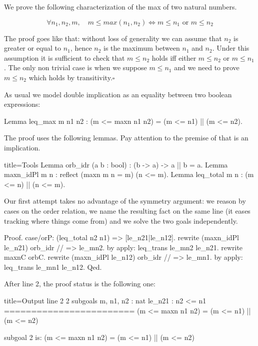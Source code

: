We prove the following characterization of the max of two natural numbers.

$$
\forall n_1, n_2, m, \quad m \le max(n_1,n_2)
\Leftrightarrow m \le n_1 \textrm{ or } m \le n_2
$$

The proof goes like that: without loss of generality we can assume that
$n_2$ is greater or equal to $n_1$, hence $n_2$ is the maximum between
$n_1$ and $n_2$.  Under this assumption it is sufficient to check
that $m \le n_2$ holds iff either $m \le n_2$ or $m \le n_1$.
The only non trivial case is when we suppose $m \le n_1$ and
we need to prove $m \le n_2$ which holds by transitivity.\hfill$\square$

As usual we model double implication as an equality between two
boolean expressions:

\begin{coq}{}{}
Lemma leq_max m n1 n2 : (m <= maxn n1 n2) = (m <= n1) || (m <= n2).
\end{coq}

The proof uses the following lemmas.  Pay attention to the premise of
 that is an implication.

\begin{coq}{}{title=Tools}
Lemma orb_idr (a b : bool) : (b -> a) -> a || b = a.
Lemma maxn_idPl {m n} : reflect (maxn m n = m) (n <= m).
Lemma leq_total m n : (m <= n) || (n <= m).
\end{coq}

Our first attempt takes no advantage of the symmetry argument:
we reason by cases on the order relation,
we name the resulting fact on the same line
(it eases tracking where things come from) and we solve the two
goals independently.

\begin{coq}{}{}
Proof.
case/orP: (leq_total n2 n1) => [le_n21|le_n12].
  rewrite (maxn_idPl le_n21) orb_idr // => le_mn2.
  by apply: leq_trans le_mn2 le_n21.
rewrite maxnC orbC.
rewrite (maxn_idPl le_n12) orb_idr // => le_mn1.
by apply: leq_trans le_mn1 le_n12.
Qed.
\end{coq}

After line 2, the proof status is the following one:

\begin{coqout}{}{title=Output line 2}
2 subgoals
m, n1, n2 : nat
le_n21 : n2 <= n1
========================
(m <= maxn n1 n2) = (m <= n1) || (m <= n2)

subgoal 2 is:
(m <= maxn n1 n2) = (m <= n1) || (m <= n2)
\end{coqout}


